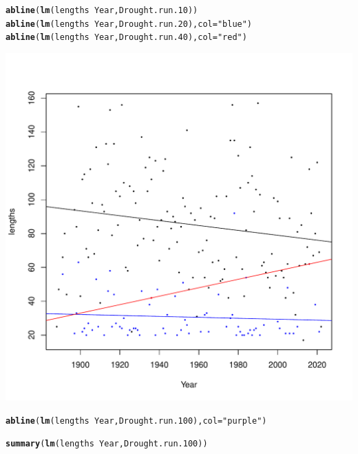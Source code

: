 \documentclass{article}\usepackage[]{graphicx}\usepackage[]{color}
\makeatletter
\def\maxwidth{ %
  \ifdim\Gin@nat@width>\linewidth
    \linewidth
  \else
    \Gin@nat@width
  \fi
}
\newcommand{\hlstr}[1]{\textcolor[rgb]{0.192,0.494,0.8}{#1}}%
\newcommand{\hlopt}[1]{\textcolor[rgb]{0,0,0}{#1}}%
\newcommand{\hlstd}[1]{\textcolor[rgb]{0.345,0.345,0.345}{#1}}%
\newcommand{\hlkwc}[1]{\textcolor[rgb]{0.333,0.667,0.333}{#1}}%
\newcommand{\hlkwd}[1]{\textcolor[rgb]{0.737,0.353,0.396}{\textbf{#1}}}%
\newenvironment{kframe}{%
 \def\at@end@of@kframe{}%
 \ifinner\ifhmode%
  \def\at@end@of@kframe{\end{minipage}}%
  \begin{minipage}{\columnwidth}%
 \fi\fi%
 \def\FrameCommand##1{\hskip\@totalleftmargin \hskip-\fboxsep
 \colorbox{shadecolor}{##1}\hskip-\fboxsep
     \hskip-\linewidth \hskip-\@totalleftmargin \hskip\columnwidth}%
 \MakeFramed {\advance\hsize-\width
   \@totalleftmargin\z@ \linewidth\hsize
   \@setminipage}}%
 {\par\unskip\endMakeFramed%
 \at@end@of@kframe}
\newenvironment{knitrout}{}{} %
\makeatother
\begin{document}
\begin{knitrout}
\begin{kframe}
{\ttfamily\noindent\bfseries\color{errorcolor}{\#\# Error in eval(m\$data, eframe): object 'Drought.run.100' not found}}\begin{alltt}
\hlkwd{abline}\hlstd{(}\hlkwd{lm}\hlstd{(lengths}\hlopt{~}\hlstd{Year, Drought.run.10))}
\hlkwd{abline}\hlstd{(}\hlkwd{lm}\hlstd{(lengths}\hlopt{~}\hlstd{Year, Drought.run.20),} \hlkwc{col}\hlstd{=}\hlstr{"blue"}\hlstd{)}
\hlkwd{abline}\hlstd{(}\hlkwd{lm}\hlstd{(lengths}\hlopt{~}\hlstd{Year, Drought.run.40),} \hlkwc{col}\hlstd{=}\hlstr{"red"}\hlstd{)}
\end{alltt}
\end{kframe}
\includegraphics[width=\maxwidth]{figure/unnamed-chunk-10-1} 
\begin{kframe}\begin{alltt}
\hlkwd{abline}\hlstd{(}\hlkwd{lm}\hlstd{(lengths}\hlopt{~}\hlstd{Year, Drought.run.100),} \hlkwc{col}\hlstd{=}\hlstr{"purple"}\hlstd{)}
\end{alltt}


{\ttfamily\noindent\bfseries\color{errorcolor}{\#\# Error in is.data.frame(data): object 'Drought.run.100' not found}}\begin{alltt}
\hlkwd{summary}\hlstd{(}\hlkwd{lm}\hlstd{(lengths}\hlopt{~}\hlstd{Year, Drought.run.100))}
\end{alltt}



\end{kframe}
\end{knitrout}
\end{document}
